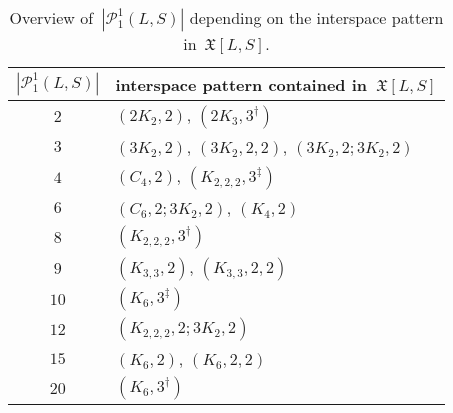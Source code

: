 \documentclass[english,a4paper]{article}
\theoremstyle{plain}
\theoremstyle{definition}
\newcommand{\abs}[1]{| #1 |}
\newcommand{\coherentConfig}{\ensuremath{\mathfrak{X}}}
\newcommand{\interspace}[2]{\ensuremath{\coherentConfig[#1,#2]}}
\newcommand{\partition}[1]{\ensuremath{\mathcal{P}^1_1(#1)}}
\newcommand{\ipfourClique}  {\ensuremath{(\clique{4},2)}}
\newcommand{\ipfourMatching}{\ensuremath{(\disjointCliques{2}{2},2)}}
\newcommand{\ipfourCycle}   {\ensuremath{(\cycle{4},2)}}
\newcommand{\ipsixCliqueTwo}     {\ensuremath{(\clique{6},2)}}
\newcommand{\ipsixCliqueTwoTwice}{\ensuremath{(\clique{6},2,2)}}
\newcommand{\ipsixCliqueThree}   {\ensuremath{(\clique{6},3^\dag)}}
\newcommand{\ipsixCliqueThreeD}	 {\ensuremath{(\clique{6},3^\ddag)}}
\newcommand{\ipsixMatching}             {\ensuremath{(\disjointCliques{3}{2},2)}}
\newcommand{\ipsixMatchingTwice}        {\ensuremath{(\disjointCliques{3}{2},2,2)}}
\newcommand{\ipsixMatchingMatching}     {\ensuremath{(\disjointCliques{3}{2},2;\disjointCliques{3}{2},2)}}
\newcommand{\ipsixMatchingAndCycle}     {\ensuremath{(\cycle{6},2;\disjointCliques{3}{2},2)}}
\newcommand{\ipsixMatchingAndComplement}{\ensuremath{(\clique{2,2,2},2;\disjointCliques{3}{2},2)}}
\newcommand{\ipsixTriangle}               {\ensuremath{(\disjointCliques{2}{3},3^\dag)}}
\newcommand{\ipsixTriangleComplement}     {\ensuremath{(\clique{3,3},2)}}
\newcommand{\ipsixTriangleComplementTwice}{\ensuremath{(\clique{3,3},2,2)}}
\newcommand{\ipsixMatchingComplement} {\ensuremath{(\clique{2,2,2},3^\dag)}}
\newcommand{\ipsixMatchingComplementD}{\ensuremath{(\clique{2,2,2},3^\ddag)}}
\newcommand{\clique}[1]{\ensuremath{K_{#1}}}
\newcommand{\cycle}[1]{\ensuremath{C_{#1}}}
\newcommand{\disjointCliques}[2]{\ensuremath{#1 \clique{#2}}}
\begin{document}
\begin{table}[tbp]
    \centering{}\begin{tabular}{|c|l|}
        \hline
        $\abs{\partition{L,S}}$ & interspace pattern contained in~$\interspace{L}{S}$                   \\ \hline
        $2$                     & $\ipfourMatching$, $\ipsixTriangle$                                   \\ \hline
        $3$                     & $\ipsixMatching$, $\ipsixMatchingTwice$, $\ipsixMatchingMatching$     \\ \hline
        $4$                     & $\ipfourCycle$, $\ipsixMatchingComplementD$                           \\ \hline
        $6$                     & $\ipsixMatchingAndCycle$, $\ipfourClique$                             \\ \hline
        $8$                     & $\ipsixMatchingComplement$                                            \\ \hline
        $9$                     & $\ipsixTriangleComplement$, $\ipsixTriangleComplementTwice$           \\ \hline
        $10$                    & $\ipsixCliqueThreeD$                                                  \\ \hline
        $12$                    & $\ipsixMatchingAndComplement$                                         \\ \hline
        $15$                    & $\ipsixCliqueTwo$, $\ipsixCliqueTwoTwice$                             \\ \hline
        $20$                    & $\ipsixCliqueThree$                                                   \\ \hline
    \end{tabular}
    \caption{Overview of~$\abs{\partition{L,S}}$ depending on the interspace pattern in~$\interspace{L}{S}$.}
    \label{interspace-pattern:partition-size/tab}
\end{table}

 
\end{document}
